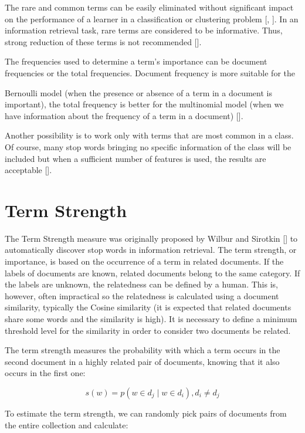 The rare and common terms can be easily eliminated without significant impact on the performance of a learner in a classification or clustering problem [\cite{ref270}, \cite{ref64}]. In an information retrieval task, rare terms are considered to be informative. Thus, strong reduction of these terms is not recommended [\cite{ref286}].

The frequencies used to determine a term's importance can be document frequencies or the total frequencies. Document frequency is more suitable for the

Bernoulli model (when the presence or absence of a term in a document is important), the total frequency is better for the multinomial model (when we have information about the frequency of a term in a document) [\cite{ref185}].

Another possibility is to work only with terms that are most common in a class. Of course, many stop words bringing no specific information of the class will be included but when a sufficient number of features is used, the results are acceptable [\cite{ref185}].

\section{Term Strength}
The Term Strength measure was originally proposed by Wilbur and Sirotkin [\cite{ref278}] to automatically discover stop words in information retrieval. The term strength, or importance, is based on the occurrence of a term in related documents. If the labels of documents are known, related documents belong to the same category. If the labels are unknown, the relatedness can be defined by a human. This is, however, often impractical so the relatedness is calculated using a document similarity, typically the Cosine similarity (it is expected that related documents share some words and the similarity is high). It is necessary to define a minimum threshold level for the similarity in order to consider two documents be related.

The term strength measures the probability with which a term occurs in the second document in a highly related pair of documents, knowing that it also occurs in the first one:


\begin{equation*}
s(w)=p\left(w \in d_{j} \mid w \in d_{i}\right), d_{i} \neq d_{j} \tag{14.21}
\end{equation*}


To estimate the term strength, we can randomly pick pairs of documents from the entire collection and calculate:


